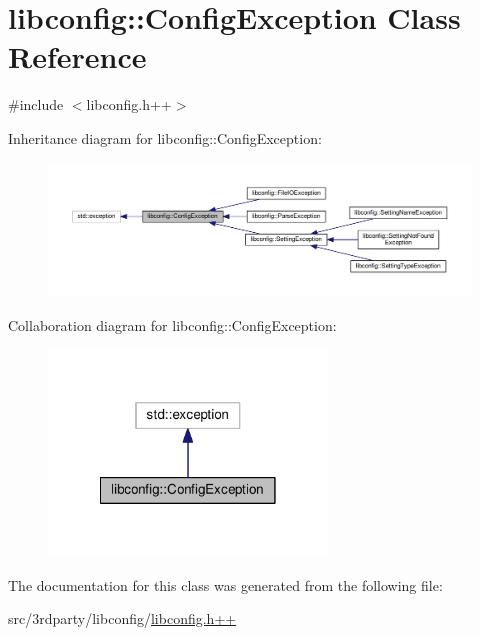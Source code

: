 \hypertarget{classlibconfig_1_1ConfigException}{\section{libconfig\-:\-:Config\-Exception Class Reference}
\label{classlibconfig_1_1ConfigException}
}


{\ttfamily \#include $<$libconfig.\-h++$>$}



Inheritance diagram for libconfig\-:\-:Config\-Exception\-:\nopagebreak
\begin{figure}[H]
\begin{center}
\leavevmode
\includegraphics[width=350pt]{classlibconfig_1_1ConfigException__inherit__graph}
\end{center}
\end{figure}


Collaboration diagram for libconfig\-:\-:Config\-Exception\-:\nopagebreak
\begin{figure}[H]
\begin{center}
\leavevmode
\includegraphics[width=210pt]{classlibconfig_1_1ConfigException__coll__graph}
\end{center}
\end{figure}


The documentation for this class was generated from the following file\-:\begin{DoxyCompactItemize}
\item 
src/3rdparty/libconfig/\hyperlink{libconfig_8h_09_09}{libconfig.\-h++}\end{DoxyCompactItemize}
